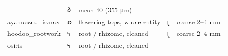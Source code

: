 \begin{longtable}[]{@{}lllll@{}}
\begin{minipage}[t]{0.17\columnwidth}
\end{minipage} & \begin{minipage}[t]{0.17\columnwidth}\raggedright
𐑔\strut
\end{minipage} & \begin{minipage}[t]{0.17\columnwidth}\raggedright
mesh 40 (355 μm)\strut
\end{minipage}\tabularnewline
\begin{minipage}[t]{0.17\columnwidth}\raggedright
ayahuasca\_icaros\strut
\end{minipage} & \begin{minipage}[t]{0.17\columnwidth}\raggedright
𐑸\strut
\end{minipage} & \begin{minipage}[t]{0.17\columnwidth}\raggedright
flowering tops, whole entity\strut
\end{minipage} & \begin{minipage}[t]{0.17\columnwidth}\raggedright
𐑚\strut
\end{minipage} & \begin{minipage}[t]{0.17\columnwidth}\raggedright
coarse 2--4 mm\strut
\end{minipage}\tabularnewline
\begin{minipage}[t]{0.17\columnwidth}\raggedright
hoodoo\_rootwork\strut
\end{minipage} & \begin{minipage}[t]{0.17\columnwidth}\raggedright
𐑰\strut
\end{minipage} & \begin{minipage}[t]{0.17\columnwidth}\raggedright
root / rhizome, cleaned\strut
\end{minipage} & \begin{minipage}[t]{0.17\columnwidth}\raggedright
𐑚\strut
\end{minipage} & \begin{minipage}[t]{0.17\columnwidth}\raggedright
coarse 2--4 mm\strut
\end{minipage}\tabularnewline
\begin{minipage}[t]{0.17\columnwidth}\raggedright
osiris\strut
\end{minipage} & \begin{minipage}[t]{0.17\columnwidth}\raggedright
𐑰\strut
\end{minipage} & \begin{minipage}[t]{0.17\columnwidth}\raggedright
root / rhizome, cleaned\strut
\end{minipage} & \begin{minipage}[t]{0.17\columnwidth}\raggedright

\end{minipage}
\end{longtable}
